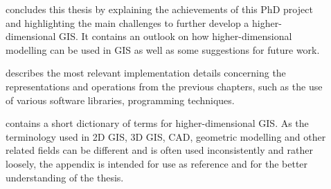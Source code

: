 \begin{description}
\item[]
concludes this thesis by explaining the achievements of this PhD project and highlighting the main challenges to further develop a higher-dimensional GIS.\@
It contains an outlook on how higher-dimensional modelling can be used in GIS as well as some suggestions for future work.

\item[]
describes the most relevant implementation details concerning the representations and operations from the previous chapters, such as the use of various software libraries,  programming techniques.

\item[] 
contains a short dictionary of terms for higher-dimensional GIS.\@
As the terminology used in 2D GIS, 3D GIS, CAD, geometric modelling and other related fields can be different and is often used inconsistently and rather loosely, the appendix is intended for use as reference and for the better understanding of the thesis.

\end{description}
